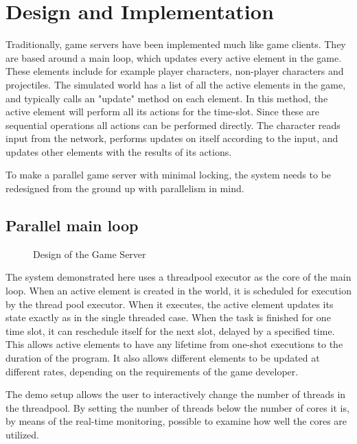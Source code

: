 \section{Design and Implementation}\label{sec:design}

Traditionally, game servers have been implemented much like game
clients. They are based around a main loop, which updates every active
element in the game.  These elements include for example player characters,
non-player characters and projectiles. The simulated world has a list
of all the active elements in the game, and typically calls an
"update" method on each element. In this method, the active element
will perform all its actions for the time-slot. 
Since these are sequential operations all actions can be performed directly. The
character reads input from the network, performs updates on itself
according to the input, and updates other elements with the results of
its actions.

To make a parallel game server with minimal locking, the system needs
to be redesigned from the ground up with parallelism in mind.
\subsection{Parallel main loop}

\begin{figure}
\centering
\vspace{-3mm}
\vspace{-2.5mm}
\caption{Design of the Game Server}
\vspace{-2.5mm}
\label{fig:server}
\vspace{-2.5mm}
\end{figure}

The system demonstrated here uses a threadpool executor as the core of
the main loop.  When an active element is created in the world, it
is scheduled for execution by the thread pool executor. When it
executes, the active element updates its state exactly as in the
single threaded case. When the task is finished for one time slot, it
can reschedule itself for the next slot, delayed by a specified time.
This allows active elements to have any lifetime from one-shot
executions to the duration of the program. It also allows different
elements to be updated at different rates, depending on the
requirements of the game developer.

The demo setup allows the user to interactively change the number of
threads in the threadpool. By setting the number of threads below the
number of cores it is, by means of the real-time monitoring, possible
to examine how well the cores are utilized.


